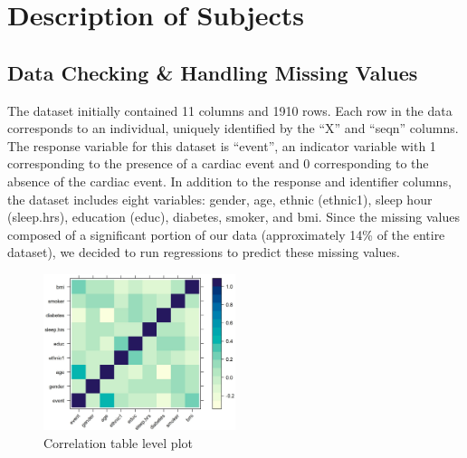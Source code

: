 \documentclass[12pt]{article}
\begin{document}

\section*{Description of Subjects}
\subsection*{{Data Checking \& Handling Missing Values}}

The dataset initially contained 11 columns and 1910 rows. Each row in the data corresponds to an individual, uniquely identified by the “X” and “seqn” columns. The response variable for this dataset is “event”, an indicator variable with 1 corresponding to the presence of a cardiac event and 0 corresponding to the absence of the cardiac event. In addition to the response and identifier columns, the dataset includes eight variables: gender, age, ethnic (ethnic1), sleep hour (sleep.hrs), education (educ), diabetes, smoker, and bmi. Since the missing values composed of a significant portion of our data (approximately 14\% of the entire dataset), we decided to run regressions to predict these missing values.\\

\begin{figure}
    \centering
    \includegraphics[width=0.5\textwidth]{Img/levelplot.jpg}
    \caption{Correlation table level plot}
\end{figure}
\end{document}
